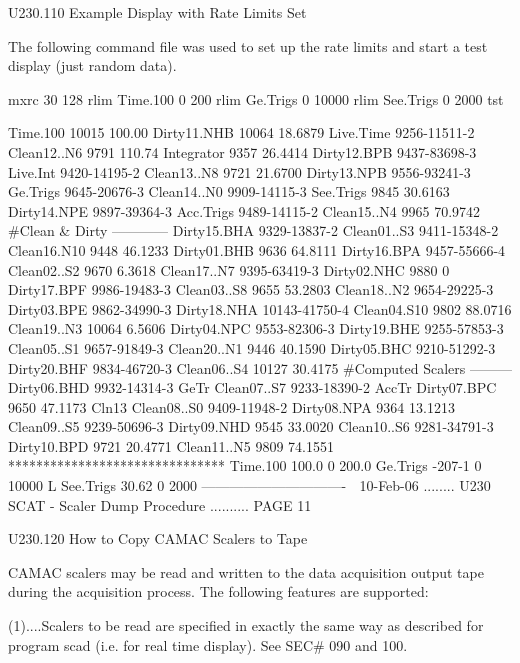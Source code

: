  
   U230.110  Example Display with Rate Limits Set
 
   The  following  command file was used to set up the rate limits and start a
   test display (just random data).
 
   mxrc 30 128
   rlim Time.100 0 200
   rlim Ge.Trigs 0 10000
   rlim See.Trigs 0 2000
   tst
 
 
   Time.100      10015  100.00    Dirty11.NHB   10064 18.6879
   Live.Time      9256-11511-2    Clean12..N6    9791  110.74
   Integrator     9357 26.4414    Dirty12.BPB    9437-83698-3
   Live.Int       9420-14195-2    Clean13..N8    9721 21.6700
                                  Dirty13.NPB    9556-93241-3
   Ge.Trigs       9645-20676-3    Clean14..N0    9909-14115-3
   See.Trigs      9845 30.6163    Dirty14.NPE    9897-39364-3
   Acc.Trigs      9489-14115-2    Clean15..N4    9965 70.9742
   #Clean & Dirty ------------    Dirty15.BHA    9329-13837-2
   Clean01..S3    9411-15348-2    Clean16.N10    9448 46.1233
   Dirty01.BHB    9636 64.8111    Dirty16.BPA    9457-55666-4
   Clean02..S2    9670  6.3618    Clean17..N7    9395-63419-3
   Dirty02.NHC    9880       0    Dirty17.BPF    9986-19483-3
   Clean03..S8    9655 53.2803    Clean18..N2    9654-29225-3
   Dirty03.BPE    9862-34990-3    Dirty18.NHA   10143-41750-4
   Clean04.S10    9802 88.0716    Clean19..N3   10064  6.5606
   Dirty04.NPC    9553-82306-3    Dirty19.BHE    9255-57853-3
   Clean05..S1    9657-91849-3    Clean20..N1    9446 40.1590
   Dirty05.BHC    9210-51292-3    Dirty20.BHF    9834-46720-3
   Clean06..S4   10127 30.4175    #Computed Scalers ---------
   Dirty06.BHD    9932-14314-3    GeTr
   Clean07..S7    9233-18390-2    AccTr
   Dirty07.BPC    9650 47.1173    Cln13
   Clean08..S0    9409-11948-2
   Dirty08.NPA    9364 13.1213
   Clean09..S5    9239-50696-3
   Dirty09.NHD    9545 33.0020
   Clean10..S6    9281-34791-3
   Dirty10.BPD    9721 20.4771
   Clean11..N5    9809 74.1551
   *******************************
   Time.100    100.0     0 200.0
   Ge.Trigs   -207-1     0 10000 L
   See.Trigs   30.62     0  2000
   -------------------------------
    
   10-Feb-06 ........ U230  SCAT  -  Scaler Dump Procedure .......... PAGE  11
 
 
   U230.120  How to Copy CAMAC Scalers to Tape
 
   CAMAC scalers may be read and written to the data acquisition  output  tape
   during the acquisition process. The following features are supported:
 
   (1)....Scalers  to  be  read  are  specified  in  exactly  the  same way as
          described for program scad (i.e. for real time  display).  See  SEC#
          090 and 100.
 
